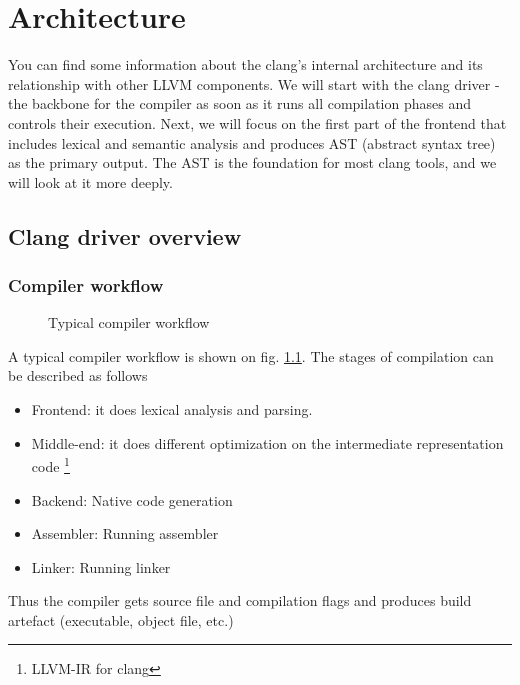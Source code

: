 \chapter{Architecture}
You can find some information about the clang’s internal architecture and its
relationship with other LLVM components. We will start with the clang driver -
the backbone for the compiler as soon as it runs all compilation phases and
controls their execution. Next, we will focus on the first part of the frontend
that includes lexical and semantic analysis and produces AST (abstract syntax
tree) as the primary output. The AST is the foundation for most clang tools, and
we will look at it more deeply. 

\section{Clang driver overview}

\subsection{Compiler workflow}

\begin{figure}
\begin{center}
\end{center}
  \caption{Typical compiler workflow}
  \label{fig:compiler_workflow}
\end{figure}
A typical compiler workflow is shown on fig. \ref{fig:compiler_workflow}. The
stages of compilation can be described as follows
\begin{itemize}
\item Frontend: it does lexical analysis and parsing.
\item Middle-end: it does different optimization on the intermediate
  representation code \footnote{LLVM-IR for clang}
\item Backend: Native code generation
\item Assembler: Running assembler
\item Linker: Running linker
\end{itemize}

Thus the compiler gets source file and compilation flags and produces build
artefact (executable, object file, etc.)

